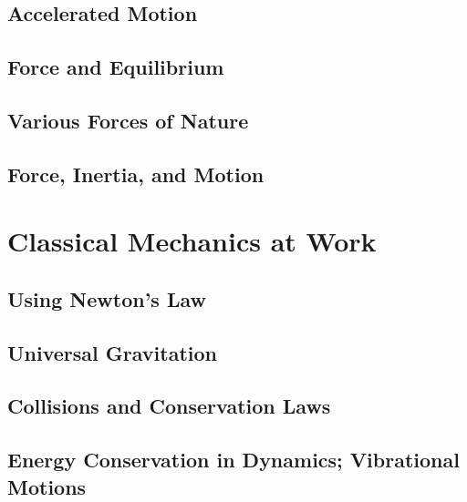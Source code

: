 \documentclass[12pt,a4paper]{book}
\begin{document}
\chapter{Accelerated Motion} \label{ch: 3-accelerated-motion}
\chapter{Force and Equilibrium} \label{ch: 4-force-equilibrium}
\chapter{Various Forces of Nature} \label{ch: 5-forces-of-nature}
\chapter{Force, Inertia, and Motion} \label{ch: 6-force-inertia-motion}
\part{Classical Mechanics at Work}
\chapter{Using Newton's Law} \label{ch: 7-newtons-law}
\chapter{Universal Gravitation}\label{ch: 8-universal-gravitation}
\chapter{Collisions and Conservation Laws} \label{ch: 9-collisions}
\chapter[Energy Conservation in Dynamics]{Energy Conservation in Dynamics; Vibrational Motions}\label{ch: 10-energy-conservation}








\appendix
\end{document}
